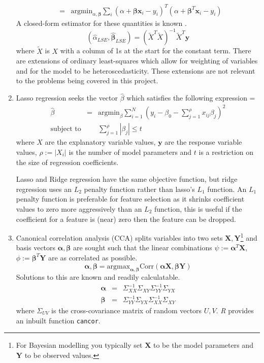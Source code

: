 \documentclass[11pt,a4paper]{article}
\theoremstyle{break}
\begin{document}
\begin{enumerate}
\[\begin{array}{rcl}
      &=&\text{argmin}_{\alpha,\pmb\beta}\sum_i \left(\alpha+\pmb\beta\mathbf{x}_i-y_i\right)^T\left(\alpha+\pmb\beta^T\mathbf{x}_i-y_i\right)
    \end{array}\]
    A closed-form estimator for these quantities is known \cite[]{econometrics}.
    \[ (\hat\alpha_{LSE},\hat{\pmb\beta}_{LSE})=\left(\tilde{X}^T\tilde{X}\right)^{-1}\tilde{X}^T \mathbf{y} \]
    where $\tilde{X}$ is $X$ with a column of 1s at the start for the constant term. There are extensions of ordinary least-squares which allow for weighting of variables and for the model to be heteroscedasticity. These extensions are not relevant to the problems being covered in this project.

    \item Lasso regression \cite[]{elements_of_statistical_learning} seeks the vector $\hat\beta$ which satisfies the following expression
    \everymath={\displaystyle}
    \[\begin{array}{rcl}
      \hat\beta&=&\text{argmin}_\beta\sum_{i=1}^N\left(y_i-\beta_0-\sum_{j=1}^\rho x_{ij}\beta_j\right)^2\\
      \text{subject to}&&\sum_{j=1}^\rho|\beta_j|\leq t
    \end{array}\]
    where $X$ are the explanatory variable values, $\mathbf{y}$ are the response variable values, $\rho:=|X_i|$ is the number of model parameters and $t$ is a restriction on the size of regression coefficients.
    \par Lasso and Ridge regression have the same objective function, but ridge regression uses an $L_2$ penalty function rather than lasso's $L_1$ function. An $L_1$ penalty function is preferable for feature selection as it shrinks coefficient values to zero more aggressively than an $L_2$ function, this is useful if the coefficient for a feature is (near) zero then the feature can be dropped.

    \item Canonical correlation analysis (CCA) \cite[]{multivariate_analysis} splits variables into two sets $\mathbf{X},\mathbf{Y}$\footnote{For Bayesian modelling you typically set $\mathbf{X}$ to be the model parameters and $ \textbf{Y}$ to be observed values.} and basis vectors $\pmb\alpha,\pmb\beta$ are sought such that the linear combinations ${\psi:=\pmb\alpha^T\mathbf{X}}$, ${\phi:=\pmb\beta^T\mathbf{Y}}$ are as correlated as possible. %
    \[ \pmb\alpha,\pmb\beta=\text{argmax}_{\pmb\alpha,\pmb\beta}\text{Corr}(\pmb\alpha\mathbf{X},\pmb\beta\mathbf{Y}) \]
    Solutions to this are known and readily calculatable.
    \[\begin{array}{rcl}
      \pmb\alpha&=&\Sigma_{XX}^{-1}\Sigma_{XY}\Sigma_{YY}^{-1}\Sigma_{YX}\\
      \pmb\beta&=&\Sigma_{YY}^{-1}\Sigma_{YX}\Sigma_{XX}^{-1}\Sigma_{XY}
    \end{array}\]
    where $\Sigma_{UV}$ is the cross-covariance matrix of random vectors $U,V$. \textit{R} provides an inbuilt function \texttt{cancor}.
  \end{enumerate}
\end{document}
